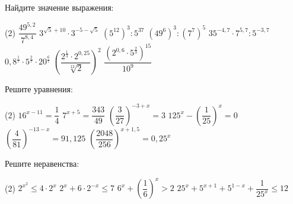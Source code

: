 \begin{class}[number=3]
	\begin{listofex}
		\item Найдите значение выражения: %
		\begin{tasks}(2)
			\task \( \dfrac{49^{5,2}}{7^{8,4}} \)
			\task \( 3^{\sqrt{5}+10} \cdot 3^{-5-\sqrt{5}} \)
			\task \( (5^{12})^3:5^37 \)
			\task \( (49^6)^3 : (7^7)^5 \)
			\task \( 35^{-4,7} \cdot 7^{5,7} : 5^{-3,7} \)
			\task \( 0,8^{\tfrac{1}{7}} \cdot 5^{\tfrac{2}{7}} \cdot 20^{\tfrac{6}{7}} \)
			\task \( \left( \dfrac{2^{\tfrac{1}{3}} \cdot 2^{0,25}} {\sqrt[12]{2}} \right)^2 \)
			\task \( \dfrac{\left( 2^{0,6} \cdot 5^{\tfrac{2}{3}} \right)^{15}}{10^9} \)
		\end{tasks}
		\item Решите уравнения:
		\begin{tasks}(2)
			\task \( 16^{x-11} = \dfrac{1}{4} \)
			\task \( 7^{x+5}=\dfrac{343}{49} \)
			\task \( \left( \dfrac{3}{27} \right)^{-3+x}=3 \) 
			\task \( 125^x - \left( \dfrac{1}{25} \right)^x = 0  \)
			\task \( \left( \dfrac{4}{81} \right)^{-13-x}= 91,125 \)
			\task \( \left( \dfrac{2048}{256} \right)^{x+1,5}=0,25^x \)
		\end{tasks}
		\item Решите неравенства:
		\begin{tasks}(2)
			\task \( 2^{x^2} \le 4 \cdot 2^x \) %
			\task \( 2^x + 6 \cdot 2^{-x} \le 7 \) %
			\task \( 6^x+\left( \dfrac{1}{6} \right)^x > 2  \) %
			\task \( 25^x + 5^{x+1}+5^{1-x} +  \dfrac{1}{25^x} \le 12 \) %
		\end{tasks}
	\end{listofex}
\end{class}

